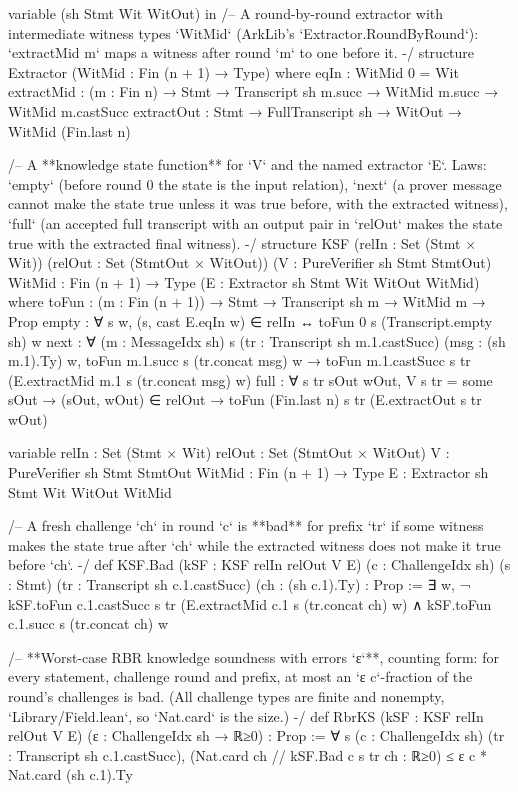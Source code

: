 \begin{leancode}[fontsize=\scriptsize,label={\footnotesize Contract/Security.lean}]
variable (sh Stmt Wit WitOut) in
/-- A round-by-round extractor with intermediate witness types `WitMid` (ArkLib's
`Extractor.RoundByRound`): `extractMid m` maps a witness after round `m` to one before it. -/
structure Extractor (WitMid : Fin (n + 1) → Type) where
  eqIn : WitMid 0 = Wit
  extractMid : (m : Fin n) → Stmt → Transcript sh m.succ → WitMid m.succ → WitMid m.castSucc
  extractOut : Stmt → FullTranscript sh → WitOut → WitMid (Fin.last n)

/-- A **knowledge state function** for `V` and the named extractor `E`. Laws: `empty` (before
round 0 the state is the input relation), `next` (a prover message cannot make the state true
unless it was true before, with the extracted witness), `full` (an accepted full transcript with
an output pair in `relOut` makes the state true with the extracted final witness). -/
structure KSF (relIn : Set (Stmt × Wit)) (relOut : Set (StmtOut × WitOut))
    (V : PureVerifier sh Stmt StmtOut) {WitMid : Fin (n + 1) → Type}
    (E : Extractor sh Stmt Wit WitOut WitMid) where
  toFun : (m : Fin (n + 1)) → Stmt → Transcript sh m → WitMid m → Prop
  empty : ∀ s w, (s, cast E.eqIn w) ∈ relIn ↔ toFun 0 s (Transcript.empty sh) w
  next : ∀ (m : MessageIdx sh) s (tr : Transcript sh m.1.castSucc) (msg : (sh m.1).Ty) w,
    toFun m.1.succ s (tr.concat msg) w → toFun m.1.castSucc s tr (E.extractMid m.1 s (tr.concat msg) w)
  full : ∀ s tr sOut wOut, V s tr = some sOut → (sOut, wOut) ∈ relOut →
    toFun (Fin.last n) s tr (E.extractOut s tr wOut)

variable {relIn : Set (Stmt × Wit)} {relOut : Set (StmtOut × WitOut)}
  {V : PureVerifier sh Stmt StmtOut} {WitMid : Fin (n + 1) → Type}
  {E : Extractor sh Stmt Wit WitOut WitMid}

/-- A fresh challenge `ch` in round `c` is **bad** for prefix `tr` if some witness makes the state
true after `ch` while the extracted witness does not make it true before `ch`. -/
def KSF.Bad (kSF : KSF relIn relOut V E) (c : ChallengeIdx sh) (s : Stmt)
    (tr : Transcript sh c.1.castSucc) (ch : (sh c.1).Ty) : Prop :=
  ∃ w, ¬ kSF.toFun c.1.castSucc s tr (E.extractMid c.1 s (tr.concat ch) w) ∧
    kSF.toFun c.1.succ s (tr.concat ch) w

/-- **Worst-case RBR knowledge soundness with errors `ε`**, counting form: for every statement,
challenge round and prefix, at most an `ε c`-fraction of the round's challenges is bad. (All
challenge types are finite and nonempty, `Library/Field.lean`, so `Nat.card` is the size.) -/
def RbrKS (kSF : KSF relIn relOut V E) (ε : ChallengeIdx sh → ℝ≥0) : Prop :=
  ∀ s (c : ChallengeIdx sh) (tr : Transcript sh c.1.castSucc),
    (Nat.card {ch // kSF.Bad c s tr ch} : ℝ≥0) ≤ ε c * Nat.card (sh c.1).Ty


\end{leancode}
